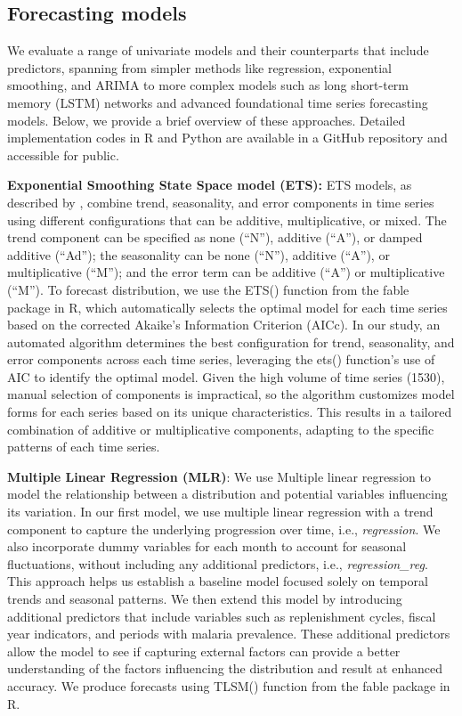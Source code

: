 \documentclass[
  authoryear,
  preprint,
  3p]{elsarticle}
\begin{document}
\subsection{Forecasting models}\label{forecasting-models}

We evaluate a range of univariate models and their counterparts that
include predictors, spanning from simpler methods like regression,
exponential smoothing, and ARIMA to more complex models such as long
short-term memory (LSTM) networks and advanced foundational time series
forecasting models. Below, we provide a brief overview of these
approaches. Detailed implementation codes in R and Python are available
in a GitHub repository and accessible for public.

\textbf{Exponential Smoothing State Space model (ETS):} ETS models, as
described by \citet{hyndman2021forecasting}, combine trend, seasonality,
and error components in time series using different configurations that
can be additive, multiplicative, or mixed. The trend component can be
specified as none (``N''), additive (``A''), or damped additive
(``Ad''); the seasonality can be none (``N''), additive (``A''), or
multiplicative (``M''); and the error term can be additive (``A'') or
multiplicative (``M''). To forecast distribution, we use the ETS()
function from the fable package in R, which automatically selects the
optimal model for each time series based on the corrected Akaike's
Information Criterion (AICc). In our study, an automated algorithm
determines the best configuration for trend, seasonality, and error
components across each time series, leveraging the ets() function's use
of AIC to identify the optimal model. Given the high volume of time
series (1530), manual selection of components is impractical, so the
algorithm customizes model forms for each series based on its unique
characteristics. This results in a tailored combination of additive or
multiplicative components, adapting to the specific patterns of each
time series.

\textbf{Multiple Linear Regression (MLR)}: We use Multiple linear
regression to model the relationship between a distribution and
potential variables influencing its variation. In our first model, we
use multiple linear regression with a trend component to capture the
underlying progression over time, i.e., \emph{regression}. We also
incorporate dummy variables for each month to account for seasonal
fluctuations, without including any additional predictors, i.e.,
\emph{regression\_reg}. This approach helps us establish a baseline
model focused solely on temporal trends and seasonal patterns. We then
extend this model by introducing additional predictors that include
variables such as replenishment cycles, fiscal year indicators, and
periods with malaria prevalence. These additional predictors allow the
model to see if capturing external factors can provide a better
understanding of the factors influencing the distribution and result at
enhanced accuracy. We produce forecasts using TLSM() function from the
fable package in R.
\end{document}

